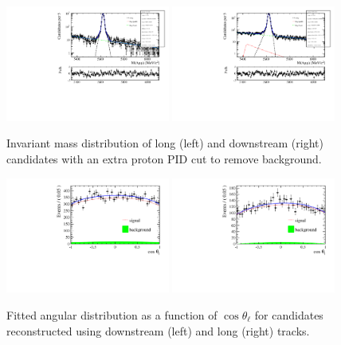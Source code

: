 \begin{figure}
\centering
\includegraphics[width=0.48\textwidth]{Lmumu/figs/Jpsi_default_LL_log_fitAndRes.pdf}
\includegraphics[width=0.48\textwidth]{Lmumu/figs/Jpsi_default_DD_log_fitAndRes.pdf}
\caption{Invariant mass distribution of \Lb\ra\jpsi\Lz long (left) and downstream (right)
candidates with an extra proton PID cut to remove \KS background. }
\label{fig:Jpsimass_angular}
\end{figure}
%
\begin{figure}[h]
\centering
\includegraphics[width=0.48\textwidth]{Lmumu/figs/AngularDistribs/Fitted/Afb_DD_jpsi.pdf}
\includegraphics[width=0.48\textwidth]{Lmumu/figs/AngularDistribs/Fitted/Afb_LL_jpsi.pdf}
\caption{Fitted angular distribution as a function of $\cos\theta_\ell$ for \Lb\to\jpsi\Lz candidates
reconstructed using downstream (left) and long (right) tracks. }
\label{fig:AngFitJpsi}
\end{figure}

